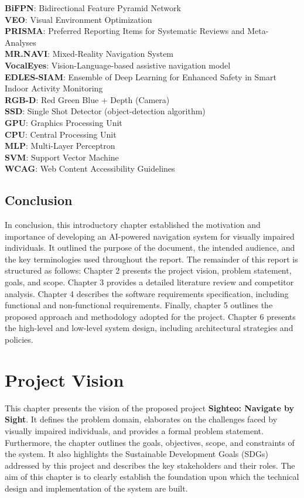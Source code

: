\documentclass{FastFyp}
\begin{document}
\textbf{BiFPN}: Bidirectional Feature Pyramid Network  \\
\textbf{VEO}: Visual Environment Optimization \\ 
\textbf{PRISMA}: Preferred Reporting Items for Systematic Reviews and Meta-Analyses  \\
\textbf{MR.NAVI}: Mixed-Reality Navigation System  \\
\textbf{VocalEyes}: Vision-Language-based assistive navigation model  \\
\textbf{EDLES-SIAM}: Ensemble of Deep Learning for Enhanced Safety in Smart Indoor Activity Monitoring  \\
\textbf{RGB-D}: Red Green Blue + Depth (Camera)  \\
\textbf{SSD}: Single Shot Detector (object-detection algorithm)  \\
\textbf{GPU}: Graphics Processing Unit  \\
\textbf{CPU}: Central Processing Unit  \\
\textbf{MLP}: Multi-Layer Perceptron  \\
\textbf{SVM}: Support Vector Machine  \\
\textbf{WCAG}: Web Content Accessibility Guidelines



\section{Conclusion}
In conclusion, this introductory chapter established the motivation and importance of developing an AI-powered navigation system for visually impaired individuals. It outlined the purpose of the document, the intended audience, and the key terminologies used throughout the report. The remainder of this report is structured as follows: Chapter 2 presents the project vision, problem statement, goals, and scope. Chapter 3 provides a detailed literature review and competitor analysis. Chapter 4 describes the software requirements specification, including functional and non-functional requirements. Finally, chapter 5 outlines the proposed approach and methodology adopted for the project. Chapter 6 presents the high-level and low-level system design, including architectural strategies and policies.

\chapter{Project Vision}
This chapter presents the vision of the proposed project \textbf{Sighteo: Navigate by Sight}. It defines the problem domain, elaborates on the challenges faced by visually impaired individuals, and provides a formal problem statement. Furthermore, the chapter outlines the goals, objectives, scope, and constraints of the system. It also highlights the Sustainable Development Goals (SDGs) addressed by this project and describes the key stakeholders and their roles. The aim of this chapter is to clearly establish the foundation upon which the technical design and implementation of the system are built.
\end{document}
